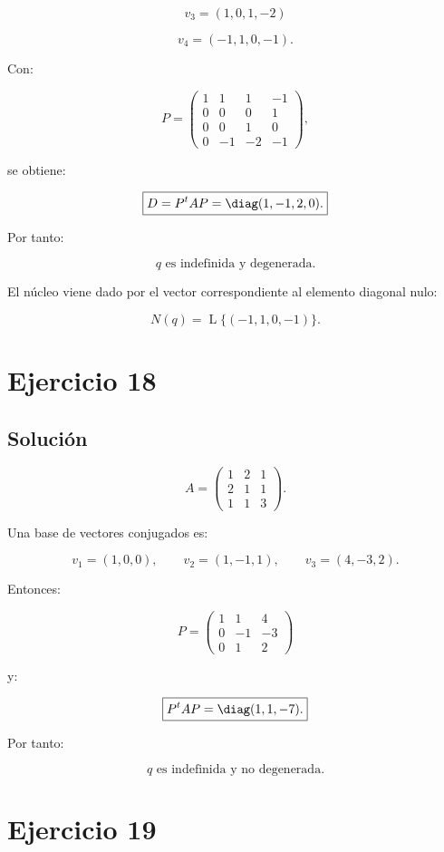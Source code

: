 \documentclass[11pt,a4paper]{article}
\newcommand{\Span}{\operatorname{L}}
\begin{document}
\[
v_3=(1,0,1,-2)
\]

\[
v_4=(-1,1,0,-1).
\]

Con:

\[
P=
\begin{pmatrix}
1&1&1&-1\\
0&0&0&1\\
0&0&1&0\\
0&-1&-2&-1
\end{pmatrix},
\]

se obtiene:

\[
\boxed{
D=P^tAP
=
\diag(1,-1,2,0).
}
\]

Por tanto:

\[
\boxed{
q\text{ es indefinida y degenerada}.
}
\]

El núcleo viene dado por el vector correspondiente al elemento diagonal nulo:

\[
\boxed{
N(q)=\Span\{(-1,1,0,-1)\}.
}
\]

\section{Ejercicio 18}
\subsection{Solución}

\[
A=
\begin{pmatrix}
1&2&1\\
2&1&1\\
1&1&3
\end{pmatrix}.
\]

Una base de vectores conjugados es:

\[
v_1=(1,0,0),
\qquad
v_2=(1,-1,1),
\qquad
v_3=(4,-3,2).
\]

Entonces:

\[
P=
\begin{pmatrix}
1&1&4\\
0&-1&-3\\
0&1&2
\end{pmatrix}
\]

y:

\[
\boxed{
P^tAP
=
\diag(1,1,-7).
}
\]

Por tanto:

\[
\boxed{
q\text{ es indefinida y no degenerada}.
}
\]

\section{Ejercicio 19}
\end{document}
